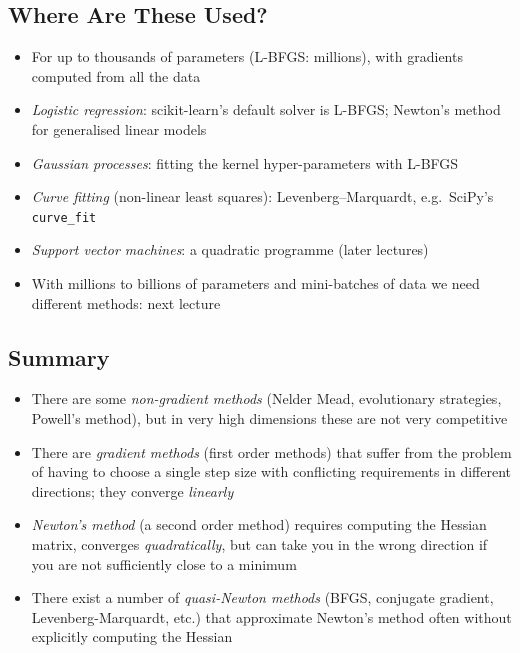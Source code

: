 \begin{slide}
\section[-1]{Where Are These Used?}

\begin{PauseHighLight}
  \begin{itemize}\squeeze
  \item For up to thousands of parameters (L-BFGS: millions), with
    gradients computed from all the data\pause
  \item \emph{Logistic regression}: scikit-learn's default solver is
    L-BFGS; Newton's method for generalised linear models\pause
  \item \emph{Gaussian processes}: fitting the kernel hyper-parameters
    with L-BFGS\pause
  \item \emph{Curve fitting} (non-linear least squares):
    Levenberg--Marquardt, e.g.\ SciPy's \texttt{curve\_fit}\pause
  \item \emph{Support vector machines}: a quadratic programme (later
    lectures)\pause
  \item With millions to billions of parameters and mini-batches of data
    we need different methods: next lecture\pause
  \end{itemize}
\end{PauseHighLight}
\end{slide}


\begin{slide}
\section[-2]{Summary}

\begin{PauseHighLight}
  \begin{itemize}
  \item There are some \emph{non-gradient methods} (Nelder Mead, evolutionary
    strategies, Powell's method), but in very high dimensions these
    are not very competitive\pause
  \item There are \emph{gradient methods} (first order methods) that
    suffer from the problem of having to choose a single step size
    with conflicting requirements in different directions; they
    converge \emph{linearly}\pause
  \item \emph{Newton's method} (a second order method) requires
    computing the Hessian matrix, converges \emph{quadratically}, but can
    take you in the wrong direction if you are not sufficiently close
    to a minimum\pause
  \item There exist a number of \emph{quasi-Newton methods}
    (BFGS, conjugate gradient, Levenberg-Marquardt, etc.) that
    approximate Newton's method often without explicitly computing
    the Hessian\pause
  \end{itemize}
\end{PauseHighLight}


\end{slide}






